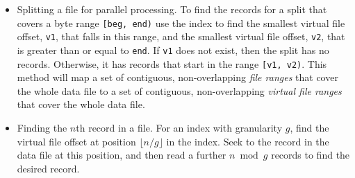 \documentclass[10pt]{article}
\begin{document}
\begin{itemize}
\item Splitting a file for parallel processing.
To find the records for a split that covers a byte range {\tt [beg,\,end)} use
the index to find the smallest virtual file offset, {\tt v1}, that falls in
this range, and the smallest virtual file offset, {\tt v2}, that is greater
than or equal to {\tt end}. If {\tt v1} does not exist, then the split has no
records. Otherwise, it has records that start in the range {\tt [v1,\,v2)}.
This method will map a set of contiguous, non-overlapping {\it file ranges}
that cover the whole data file to a set of contiguous, non-overlapping
{\it virtual file ranges} that cover the whole data file.

\item Finding the $n$th record in a file.
For an index with granularity $g$, find the virtual file offset at position
$\lfloor n/g \rfloor$ in the index. Seek to the record in the data file at this
position, and then read a further $n \bmod g$ records to find the desired
record.
\end{itemize}

\pagebreak
\end{document}
